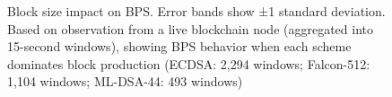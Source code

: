 \begin{figure}[!t]
    \caption{Block size impact on BPS. Error bands show ±1 standard deviation. Based on observation from a live blockchain node (aggregated into 15-second windows), showing BPS behavior when each scheme dominates block production (ECDSA: 2,294 windows; Falcon-512: 1,104 windows; ML-DSA-44: 493 windows)}
    \label{fig:block-size-impact}
\end{figure}
    
